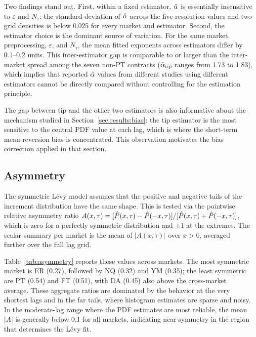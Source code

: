 \documentclass[12pt,a4paper]{article}
\begin{document}
Two findings stand out.
First, within a fixed estimator, $\hat{\alpha}$ is essentially insensitive to
$\varepsilon$ and $N_\tau$: the standard deviation of $\hat{\alpha}$ across the
five resolution values and two grid densities is below 0.025 for every market
and estimator.
Second, the estimator choice is the dominant source of variation.
For the same market, preprocessing, $\varepsilon$, and $N_\tau$, the mean
fitted exponents across estimators differ by 0.1--0.2 units.
This inter-estimator gap is comparable to or larger than the inter-market
spread among the seven non-PT contracts ($\hat{\alpha}_{\mathrm{tip}}$ ranges from
1.73 to 1.83), which implies that reported $\hat{\alpha}$ values from different
studies using different estimators cannot be directly compared without
controlling for the estimation principle.

The gap between tip and the other two estimators is also informative about
the mechanism studied in Section~\ref{sec:results:bias}: the tip estimator
is the most sensitive to the central PDF value at each lag, which is where
the short-term mean-reversion bias is concentrated.
This observation motivates the bias correction applied in that section.


\subsection{Asymmetry}
\label{sec:results:asymmetry}

The symmetric Lévy model assumes that the positive and negative tails of the
increment distribution have the same shape.
This is tested via the pointwise relative asymmetry ratio
$A(x,\tau) = [\hat{P}(x,\tau) - \hat{P}(-x,\tau)]/[\hat{P}(x,\tau) + \hat{P}(-x,\tau)]$,
which is zero for a perfectly symmetric distribution and $\pm 1$ at the extremes.
The scalar summary per market is the mean of $|A(x,\tau)|$ over $x>0$,
averaged further over the full lag grid.

Table~\ref{tab:asymmetry} reports these values across markets.
The most symmetric market is ER (0.27), followed by NQ (0.32) and YM (0.35);
the least symmetric are PT (0.54) and FT (0.51), with DA (0.45) also above
the cross-market average.
These aggregate ratios are dominated by the behavior at the very shortest
lags and in the far tails, where histogram estimates are sparse and noisy.
In the moderate-lag range where the PDF estimates are most reliable, the mean
$|A|$ is generally below 0.1 for all markets, indicating near-symmetry in the
region that determines the Lévy fit.
\end{document}
